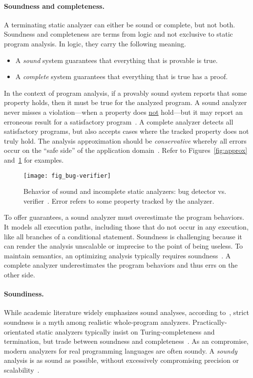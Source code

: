 \paragraph*{Soundness and completeness.}
A terminating static analyzer can either be sound or complete, but not both.
Soundness and completeness are terms from logic and not exclusive to static program analysis.
In logic, they carry the following meaning.
\begin{itemize}
\item A \emph{sound} system guarantees that everything that is provable is true.
\item A \emph{complete} system guarantees that everything that is true has a proof.
\end{itemize}
In the context of program analysis,
if a provably sound system reports that some property holds, then it must be true for the analyzed program.
A sound analyzer never misses a violation---\ie when a property does \underline{not} hold---but it may report an erroneous result for a satisfactory program~\cite{torlak2015}.
A complete analyzer detects all satisfactory programs, but also accepts cases where the tracked property does not truly hold.
The analysis approximation should be \emph{conservative}
whereby all errors occur on the \enquote{safe side} of the application domain~\cite[p. 5]{moller2023}.
Refer to Figures~\ref{fig:approx} and~\ref{fig:bug-verify} for examples.

\begin{figure}[t]
\centering
\texttt{[image: fig\_bug-verifier]}
\caption[Sound and incomplete bug detector vs. verifier]{
Behavior of sound and incomplete static analyzers: bug detector vs. verifier~\cite{moller2024}.
Error refers to some property tracked by the analyzer.}
\label{fig:bug-verify}
\end{figure}

To offer guarantees, a sound analyzer must overestimate the program behaviors.
It models all execution paths, including those that do not occur in any execution, like all branches of a conditional statement.
Soundness is challenging because it can render the analysis unscalable or imprecise to the point of being useless.
To maintain semantics, an optimizing analysis typically requires soundness~\cite[p. 5]{moller2023}.
A complete analyzer underestimates the program behaviors and thus errs on the other side.

\paragraph*{Soundiness.}
While academic literature widely emphasizes sound analyses, according to~\textcite{livshits2015}, strict soundness is a myth among realistic whole-program analyzers.
Practically-orientated static analyzers typically insist on Turing-completeness and termination,
but trade between soundness and completeness~\cite{moller2023,steffen2020}.
As an compromise, modern analyzers for real programming languages are often soundy.
A \emph{soundy} analysis is as sound as possible, without excessively compromising precision or scalability~\cite{livshits2015}.

